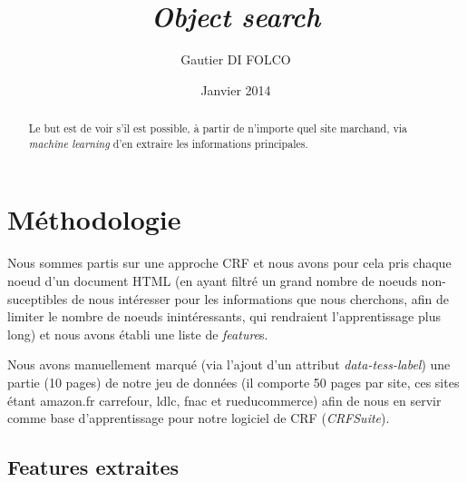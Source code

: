 \documentclass{article}
\title{\emph{Object search}}
\author{Gautier DI FOLCO}
\date{Janvier 2014}
\begin{document}
\maketitle
\tableofcontents

\begin{abstract}
Le but est de voir s'il est possible, à partir de n'importe quel site marchand,
via \emph{machine learning} d'en extraire les informations principales.
\end{abstract}

\section{Méthodologie}
Nous sommes partis sur une approche CRF et nous avons pour cela pris chaque noeud
d'un document HTML (en ayant filtré un grand nombre de noeuds non-suceptibles de
nous intéresser pour les informations que nous cherchons, afin de limiter le nombre de
noeuds inintéressants, qui rendraient l'apprentissage plus long) et nous avons établi
une liste de \emph{feature}s.

Nous avons manuellement marqué (via l'ajout d'un attribut \emph{data-tess-label})
une partie (10 pages) de notre jeu de données (il comporte 50 pages par site,
ces sites étant amazon.fr carrefour, ldlc, fnac et rueducommerce) afin de nous
en servir comme base d'apprentissage pour notre logiciel de CRF (\emph{CRFSuite}).

\subsection{Features extraites}
\end{document}

